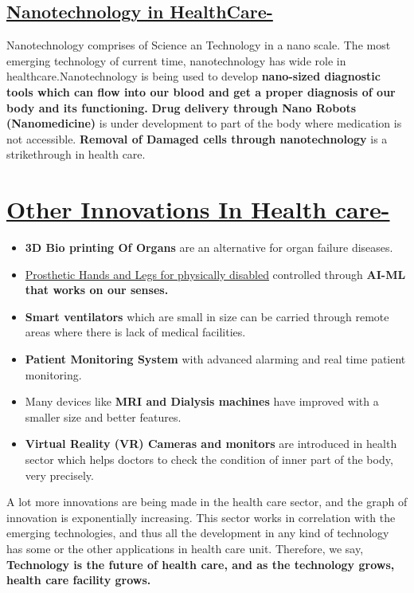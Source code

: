 \documentclass[18pt]{article}
\begin{document}
\subsection{\underline{Nanotechnology in HealthCare-}}
Nanotechnology comprises of Science an Technology in a nano scale. The most emerging technology of current time, nanotechnology has wide role in healthcare.\newline Nanotechnology is being used to develop \textbf{nano-sized diagnostic tools which can flow into our blood and get a proper diagnosis of our body and its functioning.}
\newline \textbf{Drug delivery through Nano Robots (Nanomedicine)} is under development to part of the body where medication is not accessible.
\newline \textbf{Removal of Damaged cells through nanotechnology} is a strikethrough in health care.
\section{\underline{ Other Innovations In Health care-}}
\begin {itemize}
\item \textbf{3D Bio printing Of Organs} are an alternative for organ failure diseases.
\item \underline{Prosthetic Hands and Legs for physically disabled} controlled through \textbf{AI-ML that works on our senses.}
\item \textbf{Smart ventilators} which are small in size can be carried through remote areas where there is lack of medical facilities.
\item  \textbf{Patient Monitoring System} with advanced alarming and real time patient monitoring.
\item  Many devices like \textbf{MRI and Dialysis machines} have improved with a smaller size and better features.
\item \textbf{Virtual Reality (VR) Cameras and monitors} are introduced in health sector which helps doctors to check the condition of inner part of the body, very precisely.
\end {itemize}
A lot more innovations are being made in the health care sector, and the graph of innovation is exponentially increasing. This sector works in correlation with the emerging technologies, and thus all the development in any kind of technology has some or the other applications in health care unit. Therefore, we say, \textbf{Technology is the future of health care, and as the technology grows, health care facility grows.}
\end{document}
